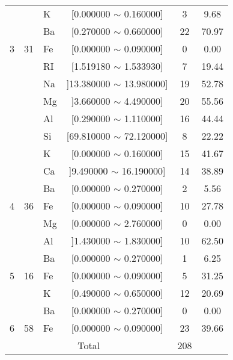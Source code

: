 \begin{apendicesenv}
\begin{table}[H]
{{\begin{tabular}{cclccc}
 &  & K   & [0.000000 $\sim$ 0.160000]  & 3 & 9.68\\
 &  & Ba  & [0.270000 $\sim$ 0.660000]  & 22 & 70.97\\
\multirow{-4}{*}{3} & \multirow{-4}{*}{31} & Fe & [0.000000 $\sim$ 0.090000]  & 0 & 0.00\\ \hline
 &  & RI  & [1.519180 $\sim$ 1.533930]  & 7 & 19.44\\
 &  & Na  & ]13.380000 $\sim$ 13.980000]  & 19 & 52.78\\
 &  & Mg  & ]3.660000 $\sim$ 4.490000]  & 20 & 55.56\\
 &  & Al  & [0.290000 $\sim$ 1.110000]  & 16 & 44.44\\
 &  & Si  & [69.810000 $\sim$ 72.120000]  & 8 & 22.22\\
 &  & K   & [0.000000 $\sim$ 0.160000]  & 15 & 41.67\\
 &  & Ca  & ]9.490000 $\sim$ 16.190000]  & 14 & 38.89\\
 &  & Ba  & [0.000000 $\sim$ 0.270000]  & 2 & 5.56\\
\multirow{-9}{*}{4} & \multirow{-9}{*}{36} & Fe  & [0.000000 $\sim$ 0.090000]  & 10 & 27.78\\ \hline
 &  & Mg  & [0.000000 $\sim$ 2.760000]  & 0 & 0.00\\
 &  & Al  & ]1.430000 $\sim$ 1.830000]  & 10 & 62.50\\
 &  & Ba  & [0.000000 $\sim$ 0.270000]  & 1 & 6.25\\
\multirow{-4}{*}{5} & \multirow{-4}{*}{16} & Fe & [0.000000 $\sim$ 0.090000]  & 5 & 31.25\\ \hline
 &  & K   & [0.490000 $\sim$ 0.650000]  & 12 & 20.69\\
 &  & Ba  & [0.000000 $\sim$ 0.270000]  & 0 & 0.00\\
\multirow{-3}{*}{6} & \multirow{-3}{*}{58} & Fe  & [0.000000 $\sim$ 0.090000]  & 23 & 39.66\\ \hline
\multicolumn{4}{c}{Total}                             & 208  & \\ \hline
\end{tabular}
} %
} %


\end{table}
\end{apendicesenv}
